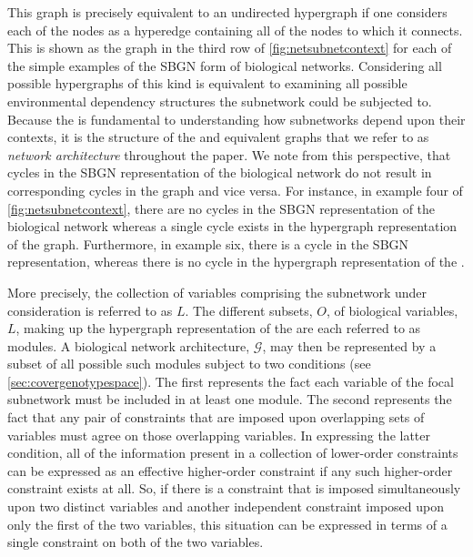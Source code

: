 This \AI{} graph is precisely equivalent to an undirected hypergraph if one considers each of the \AI{} nodes as a hyperedge containing all of the nodes to which it connects. This is shown as the \SH{} graph in the third row of \ref{fig:netsubnetcontext} for each of the simple examples of the SBGN form of biological networks. Considering all possible hypergraphs of this kind is equivalent to examining all possible environmental dependency structures the subnetwork could be subjected to. Because the \AI{} is fundamental to understanding how subnetworks depend upon their contexts, it is the structure of the \AI{} and equivalent \SH{} graphs that we refer to as \emph{network architecture} throughout the paper. We note from this perspective, that cycles in the SBGN representation of the biological network do not result in corresponding cycles in the \AI{} graph and vice versa. For instance, in example four of \ref{fig:netsubnetcontext}, there are no cycles in the SBGN representation of the biological network whereas a single cycle exists in the hypergraph representation of the \AI{} graph. Furthermore, in example six, there is a cycle in the SBGN representation, whereas there is no cycle in the hypergraph representation of the \AI{}.

More precisely, the collection of variables comprising the subnetwork under consideration is referred to as $L$. The different subsets, $O$, of biological variables, $L$, making up the hypergraph representation of the \AI{} are each referred to as modules. A biological network architecture, $\mathcal{G}$, may then be represented by a subset of all possible such modules subject to two conditions (see  \ref{sec:covergenotypespace}). The first represents the fact each variable of the focal subnetwork must be included in at least one module. The second represents the fact that any pair of constraints that are imposed upon overlapping sets of variables must agree on those overlapping variables.  In expressing the latter condition, all of the information present in a collection of lower-order constraints can be expressed as an effective higher-order constraint if any such higher-order constraint exists at all. So, if there is a constraint that is imposed simultaneously upon two distinct variables and another independent constraint imposed upon only the first of the two variables, this situation can be expressed in terms of a single constraint on both of the two variables.

